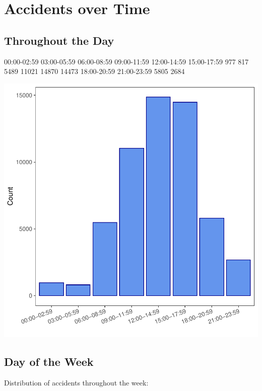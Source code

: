 \documentclass[11pt, a4paper]{article}
\begin{document}
\pagebreak
\section{Accidents over Time}

\subsection{Throughout the Day}

\begin{Schunk}
\begin{Soutput}
00:00-02:59 03:00-05:59 06:00-08:59 09:00-11:59 12:00-14:59 15:00-17:59 
        977         817        5489       11021       14870       14473 
18:00-20:59 21:00-23:59 
       5805        2684 
\end{Soutput}
\end{Schunk}
\includegraphics{variableinvestigation-003}


\pagebreak
\subsection{Day of the Week} 

Distribution of accidents throughout the week:
\end{document}
